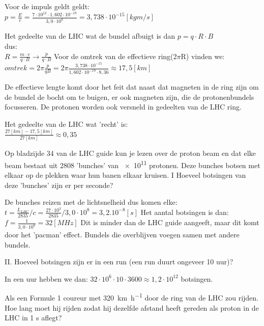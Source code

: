 \begin{questions}
Voor de impuls geldt geldt: \\
$p = \frac{E}{c} = \frac{7 \cdot 10^{12} \cdot 1,602 \cdot 10^{-19}}{3,0 \cdot 10^8} = 3,738 \cdot 10^{-15} [kg m/s]$

Het gedeelte van de LHC wat de bundel afbuigt is dan 
$ p = q \cdot R \cdot B $ \\
dus: \\
$R = \frac{m \cdot v}{q \cdot B} \rightarrow \frac{p}{q\cdot B} $
Voor de omtrek van de effectieve ring(2$\pi$R) vinden we: \\

$omtrek = 2 \pi \frac{p}{qB} = 2 \pi \frac{3,738 \cdot 10^{-15}}{1,602 \cdot 10^{-19} \cdot 8,36} \approx 17,5 [km]$

De effectieve lengte komt door het feit dat naast dat magneten in de ring zijn
om de bundel de bocht om te buigen, er ook magneten zijn, die de protonenbundels focusseren.
De protonen worden ook versneld in gedeelten van de LHC ring.

Het gedeelte van de LHC wat 'recht' is: \\
$ \frac{27 [km] - 17,5 [km]}{27 [km]} \approx 0,35$

\question
Op bladzijde 34 van de LHC guide kun je lezen over de proton beam en dat elke beam bestaat
uit 2808 'bunches' van \SI{e11}{} protonen. Deze bunches botsen met elkaar op de plekken waar 
hun banen elkaar kruisen.
I Hoeveel botsingen van deze 'bunches' zijn er per seconde?


De bunches reizen met de lichtsnelheid dus komen elke:
$t = \frac{L_{LHC}}{2835} / c = \frac{27\cdot 10^3}{2835} / 3,0 \cdot 10^8 = 3,2 .10^{-8} [s]$
Het aantal botsingen is dan: \\
$f = \frac{1}{3,0 \cdot 10^8} = 32 [MHz]$
Dit is minder dan de LHC guide aangeeft, maar dit komt door het 'pacman' effect.
Bundels die overblijven voegen samen met andere bundels.

II. Hoeveel botsingen zijn er in een run (een run duurt ongeveer 10 uur)?


In een uur hebben we dan:
$ 32\cdot10^6 \cdot 10 \cdot 3600 \approx 1,2\cdot 10^{12}$ botsingen.

\question 
Als een Formule 1 coureur met \SI{320}{\kilo\meter\per\hour} door de ring van de 
LHC zou rijden. Hoe lang moet hij rijden zodat hij dezelfde afstand heeft gereden als
proton in de LHC in 1 s aflegt?


\end{questions}

